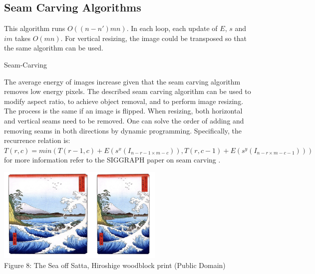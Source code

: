 \documentclass{article}
\makeatletter
\def\BState{\State\hskip-\ALG@thistlm}
\makeatother
\begin{document}
\subsection{Seam Carving Algorithms}
This algorithm runs $O((n-n')mn)$. In each loop, each update of $E$, $s$ and $im$ takes $O(mn)$. For vertical resizing, the image could be transposed so that the same algorithm can be used.
\begin{algorithm}
\caption{Seam-Carving}\label{euclid}
\end{algorithm}


The average energy of images increase given that the seam carving algorithm removes low energy pixels. The described seam carving algorithm can be used to modify aspect ratio, to achieve object removal, and to perform image resizing. The process is the same if an image is flipped. When resizing, both horizontal and vertical seams need to be removed. One can solve the order of adding and removing seams in both directions by dynamic programming. Specifically, the recurrence relation is: $T(r,c)=min(T(r-1,c)+E(s^x(I_{n-r-1\times m-c})),T(r,c-1)+E(s^y(I_{n-r\times m-c-1})))$ for more information refer to the SIGGRAPH paper on seam carving \cite{siggraphseamcarving}.

\begin{center}
\includegraphics[width=8cm]{content_aware_resizing.png} \\
Figure 8: The Sea off Satta, Hiroshige woodblock print (Public Domain)
\end{center}
\end{document}
